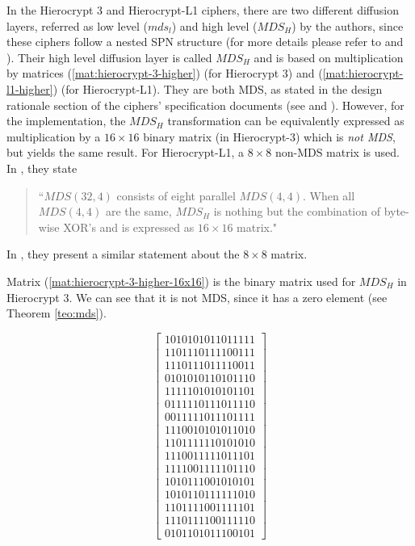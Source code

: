 In the Hierocrypt 3 and Hierocrypt-L1 ciphers, there are two different diffusion layers, referred as low level ($mds_l$) and high level ($MDS_H$) by the authors, since these ciphers follow a nested SPN structure (for more details please refer to \cite{Hierocrypt2000} and \cite{Hierocrypt-L1-2000}). Their high level diffusion layer is called $MDS_H$ and is based on multiplication by matrices (\ref{mat:hierocrypt-3-higher}) (for Hierocrypt 3) and (\ref{mat:hierocrypt-l1-higher}) (for Hierocrypt-L1). They are both MDS, as stated in the design rationale section of the ciphers' specification documents (see \cite{Hierocrypt2000} and \cite{Hierocrypt-L1-2000}). However, for the implementation, the $MDS_H$ transformation can be equivalently expressed as multiplication by a $16 \times 16$ binary matrix (in Hierocrypt-3) which is \emph{not MDS}, but yields the same result. For Hierocrypt-L1, a $8 \times 8$ non-MDS matrix is used. In \cite{Hierocrypt2000}, they state \begin{quote}``$MDS(32, 4)$ consists of eight parallel $MDS(4,4)$. When all $MDS(4,4)$ are the same, $MDS_H$ is nothing but the combination of byte-wise XOR's and is expressed as $16 \times 16$ matrix."\end{quote} In \cite{Hierocrypt-L1-2000}, they present a similar statement about the $8 \times 8$ matrix.

Matrix (\ref{mat:hierocrypt-3-higher-16x16}) is the binary matrix used for $MDS_H$ in Hierocrypt 3. We can see that it is not MDS, since it has a zero element (see Theorem \ref{teo:mds}).

\begin{equation}\label{mat:hierocrypt-3-higher-16x16}
\begin{bmatrix}
1010101011011111\\
1101110111100111\\
1110111011110011\\
0101010110101110\\
1111101010101101\\
0111110111011110\\
0011111011101111\\
1110010101011010\\
1101111110101010\\
1110011111011101\\
1111001111101110\\
1010111001010101\\
1010110111111010\\
1101111001111101\\
1110111100111110\\
0101101011100101
\end{bmatrix}
\end{equation}

